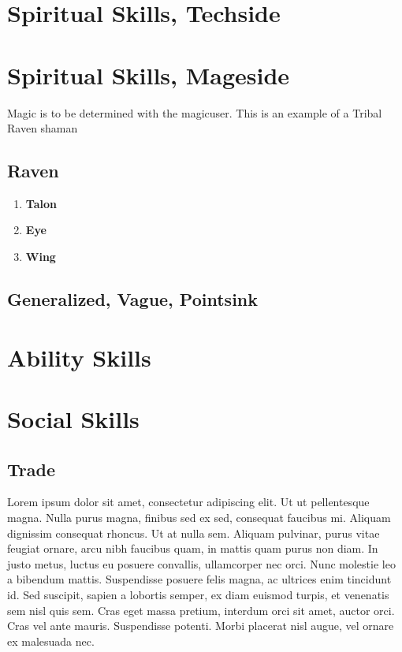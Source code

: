 \section{Spiritual Skills, Techside}\label{sec:spiritual-skills,-techside}

\section{Spiritual Skills, Mageside}\label{sec:spiritual-skills,-magicside}
Magic is to be determined with the magicuser.
This is an example of a Tribal Raven shaman
\subsection{Raven}\label{subsec:raven}
\begin{enumerate}[label= - ]
    \item \textbf{Talon} 
    \item \textbf{Eye} 
    \item \textbf{Wing} 
\end{enumerate}
\subsection{Generalized, Vague, Pointsink}\label{subsec:GVPS}
\section{Ability Skills}\label{sec:ability-skills}


\section{Social Skills}\label{sec:charisma-skills}
\subsection{Trade}\label{subsec:trade}
Lorem ipsum dolor sit amet, consectetur adipiscing elit.
    Ut ut pellentesque magna.
    Nulla purus magna, finibus sed ex sed, consequat faucibus mi.
    Aliquam dignissim consequat rhoncus.
    Ut at nulla sem.
    Aliquam pulvinar, purus vitae feugiat ornare, arcu nibh faucibus quam, in mattis quam purus non diam.
    In justo metus, luctus eu posuere convallis, ullamcorper nec orci.
    Nunc molestie leo a bibendum mattis.
    Suspendisse posuere felis magna, ac ultrices enim tincidunt id.
    Sed suscipit, sapien a lobortis semper, ex diam euismod turpis, et venenatis sem nisl quis sem.
    Cras eget massa pretium, interdum orci sit amet, auctor orci.
    Cras vel ante mauris.
    Suspendisse potenti.
    Morbi placerat nisl augue, vel ornare ex malesuada nec.

